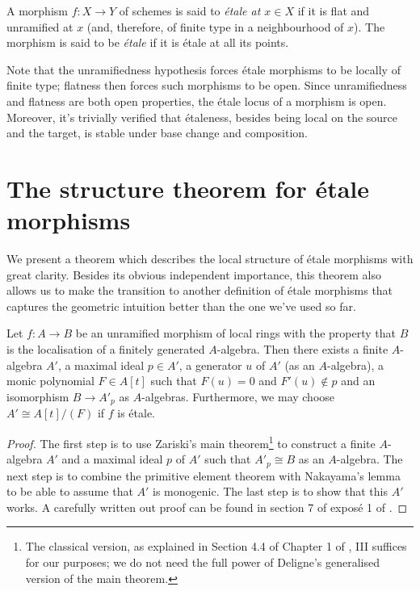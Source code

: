 \begin{definition}
\label{definition-etale-schemes-1}
A morphism $f : X \to Y$ of schemes is said to
{\it \'etale at $x \in X$} if it is
flat and unramified at $x$ (and, therefore, of finite type in a neighbourhood
of $x$). The morphism is said to be
{\it \'etale} if it is \'etale at all its points.
\end{definition}

\noindent
Note that the unramifiedness hypothesis forces \'etale morphisms to be
locally of finite type; flatness then forces such morphisms to be open.
Since unramifiedness and flatness are both open properties, the \'etale
locus of a morphism is open. Moreover, it's trivially verified that
\'etaleness, besides being local on the source and the target, is stable
under base change and composition.

\section{The structure theorem for \'etale morphisms}
\label{section-structure-etale-map}

\noindent
We present a theorem which describes the local structure of \'etale morphisms
with great clarity. Besides its obvious independent importance, this theorem
also allows us to make the transition to another definition of \'etale
morphisms that captures the geometric intuition better than the one we've
used so far.

\begin{theorem}
\label{theorem-structure-etale}
Let $f : A \to B$ be an unramified morphism of local rings with the property
that $B$ is the localisation of a finitely generated $A$-algebra. Then there
exists a finite $A$-algebra $A'$, a maximal ideal $p \in A'$, a generator
$u$ of $A'$ (as an $A$-algebra), a monic polynomial $F \in A[t]$ such that
$F(u) = 0$ and $F'(u) \notin p$ and an isomorphism $B \to A'_p$ as
$A$-algebras. Furthermore, we may choose $A' \cong A[t]/(F)$ if $f$
is \'etale.
\end{theorem}

\begin{proof}
The first step is to use Zariski's main
theorem\footnote{The classical version, as explained in Section 4.4 of
Chapter 1 of \cite{EGA}, III suffices for our purposes; we do not need the
full power of Deligne's generalised version of the main theorem.} to
construct a finite $A$-algebra $A'$ and a maximal ideal $p$ of $A'$ such
that $A'_p \cong B$ as an $A$-algebra. The next step is to combine the
primitive element theorem with Nakayama's lemma to be able to assume that
$A'$ is monogenic. The last step is to show that this $A'$ works. A
carefully written out proof can be found in section 7 of expos\'e 1 of
\cite{SGA1}.
\end{proof}

